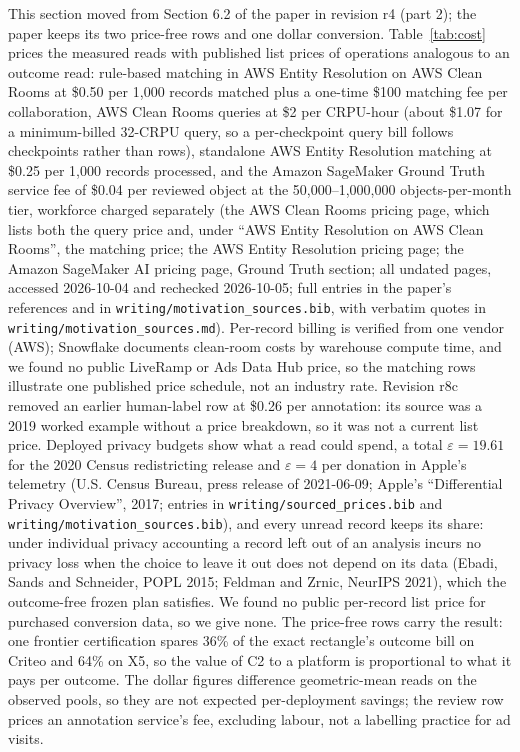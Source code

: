 \documentclass[sigconf,anonymous,review]{acmart}
\newcommand{\eps}{\varepsilon}
\begin{document}
This section moved from Section 6.2 of the paper in revision r4 (part 2); the paper keeps its two price-free rows and one dollar conversion. Table~\ref{tab:cost} prices the measured reads with published list prices of operations analogous to an outcome read: rule-based matching in AWS Entity Resolution on AWS Clean Rooms at \$0.50 per 1,000 records matched plus a one-time \$100 matching fee per collaboration, AWS Clean Rooms queries at \$2 per CRPU-hour (about \$1.07 for a minimum-billed 32-CRPU query, so a per-checkpoint query bill follows checkpoints rather than rows), standalone AWS Entity Resolution matching at \$0.25 per 1,000 records processed, and the Amazon SageMaker Ground Truth service fee of \$0.04 per reviewed object at the 50,000--1,000,000 objects-per-month tier, workforce charged separately (the AWS Clean Rooms pricing page, which lists both the query price and, under ``AWS Entity Resolution on AWS Clean Rooms'', the matching price; the AWS Entity Resolution pricing page; the Amazon SageMaker AI pricing page, Ground Truth section; all undated pages, accessed 2026-10-04 and rechecked 2026-10-05; full entries in the paper's references and in \texttt{writing/motivation\_sources.bib}, with verbatim quotes in \texttt{writing/motivation\_sources.md}). Per-record billing is verified from one vendor (AWS); Snowflake documents clean-room costs by warehouse compute time, and we found no public LiveRamp or Ads Data Hub price, so the matching rows illustrate one published price schedule, not an industry rate. Revision r8c removed an earlier human-label row at \$0.26 per annotation: its source was a 2019 worked example without a price breakdown, so it was not a current list price. Deployed privacy budgets show what a read could spend, a total $\eps = 19.61$ for the 2020 Census redistricting release and $\eps = 4$ per donation in Apple's telemetry (U.S. Census Bureau, press release of 2021-06-09; Apple's ``Differential Privacy Overview'', 2017; entries in \texttt{writing/sourced\_prices.bib} and \texttt{writing/motivation\_sources.bib}), and every unread record keeps its share: under individual privacy accounting a record left out of an analysis incurs no privacy loss when the choice to leave it out does not depend on its data (Ebadi, Sands and Schneider, POPL 2015; Feldman and Zrnic, NeurIPS 2021), which the outcome-free frozen plan satisfies. We found no public per-record list price for purchased conversion data, so we give none. The price-free rows carry the result: one frontier certification spares 36\% of the exact rectangle's outcome bill on Criteo and 64\% on X5, so the value of C2 to a platform is proportional to what it pays per outcome. The dollar figures difference geometric-mean reads on the observed pools, so they are not expected per-deployment savings; the review row prices an annotation service's fee, excluding labour, not a labelling practice for ad visits.
\end{document}
